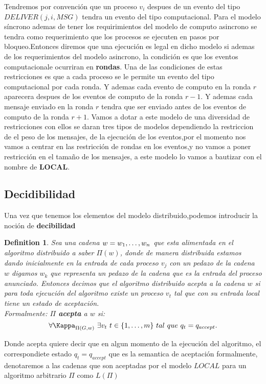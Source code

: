 \documentclass[10pt]{report}
\newtheorem{definition}{Definition}
\begin{document}
    Tendremos por convención que un proceso $v_{i}$ despues de un evento del tipo
    $DELIVER(j,i,MSG)$ tendra un evento del tipo computacional.
    Para el modelo síncrono ademas de tener los requirimientos del modelo de computo
    asincrono se tendra como requerimiento que los procesos se ejecuten en pasos por
    bloqueo.Entonces diremos que una ejecución es legal en dicho modelo si ademas de los
    requerimientos del modelo asincrono, la condición es que los eventos computacionale
    ocurriran en \textbf{rondas}.
    Una de las condiciones de estas restricciones es que a cada proceso se le permite un evento
    del tipo computacional por cada ronda.
    Y ademas cada evento de computo en la ronda $r$ aparecera despues de los
    eventos de computo de la ronda $r-1$.
    Y ademas cada mensaje enviado en la ronda $r$ tendra que ser enviado antes de
    los eventos de computo de la ronda $r+1$.
    Vamos a dotar a este modelo de una diversidad de restricciones con ellos se daran tres tipos
    de modelos dependiendo la restriccion de el peso de los mensajes, de la ejecución de los
    eventos,por el momento nos vamos a centrar en las restricción de rondas en los eventos,y no vamos
    a poner restricción en el tamaño de los mensajes, a este modelo lo vamos a bautizar con el
    nombre de \textbf{LOCAL}.
    \newpage
    \subsection{Decidibilidad}\label{subsec:decidibilidad}
    Una vez que tenemos los elementos del modelo distribuido,podemos introducir la noción de \textbf{decibilidad}
    \theoremstyle{definition}
    \begin{definition}
        Sea una cadena $w =w_{1},\mathellipsis,w_{n}$ que esta alimentada en el algoritmo distribuido a saber
        $\Pi(w)$, donde de manera distribuida estamos dando inicialmente en la entrada de cada proceso $v_{j}$ con un pedazo
        de la cadena $w$ digamos $w_{k}$ que representa un pedazo de la cadena que es la entrada del proceso anunciado.
        Entonces decimos que el algoritmo distribuido acepta a la cadena $w$ si para toda ejecución del algoritmo
        existe un proceso $v_{t}$ tal que con su entrada local tiene un estado de aceptación.\\
        Formalmente:
        $\Pi$ \textbf{acepta} a $w$ si:
        \begin{equation}
           \forall \Kappa_{\Pi(G,w)} \ \exists v_{t} \ t\in\{1,\mathellipsis,m\} \
            tal \ que \ q_{t} = q_{accept}.
        \end{equation}
    \end{definition}
    Donde acepta quiere decir que en algun momento de la ejecución del algoritmo,
    el correspondiete estado $q_{t}=q_{accept}$ que es la semantica de aceptación formalmente,
    denotaremos a las cadenas que son aceptadas por el modelo $LOCAL$ para un algoritmo arbitrario
    $\Pi$ como $L(\Pi)$
\end{document}
